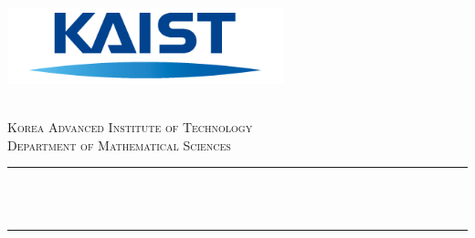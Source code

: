 \begin{titlepage}

\newcommand{\HRule}{\rule{\linewidth}{0.5mm}} %


\includegraphics[width=8cm]{title/logo.png}\\[1cm] %
 

\center %

\quad\\[1.5cm]
\textsc{\Large Korea Advanced Institute of Technology}\\[0.5cm] %
\textsc{\large Department of Mathematical Sciences}\\[0.5cm] %

\makeatletter
\HRule \\[0.4cm]
{ \huge \bfseries \@title}\\[0.4cm] %
\HRule \\[1.5cm]
 


\end{titlepage}
